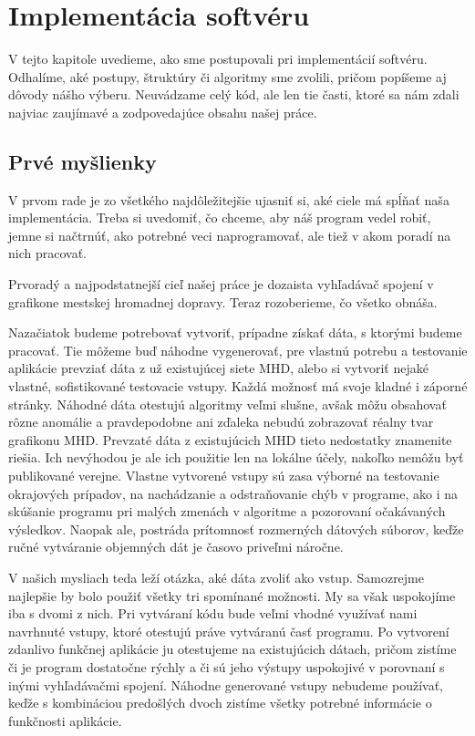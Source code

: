 \chapter[Implementácia]{Implementácia softvéru}
\label{kap:implementacia}

V tejto kapitole uvedieme, ako sme postupovali pri implementácií softvéru. Odhalíme, aké postupy, štruktúry či algoritmy sme zvolili, pričom popíšeme aj dôvody nášho výberu. Neuvádzame celý kód, ale len tie časti, ktoré sa nám zdali najviac zaujímavé a zodpovedajúce obsahu našej práce.\newline


\section{Prvé myšlienky}

V prvom rade je zo všetkého najdôležitejšie ujasniť si, aké ciele má spĺňať naša implementácia. Treba si uvedomiť, čo chceme, aby náš program vedel robiť, jemne si načtrnúť, ako potrebné veci naprogramovať, ale tiež v akom poradí na nich pracovať.\newline

Prvoradý a najpodstatnejší cieľ našej práce je dozaista vyhľadávač spojení v grafikone mestskej hromadnej dopravy. Teraz rozoberieme, čo všetko obnáša.\newline

Nazačiatok budeme potrebovať vytvoriť, prípadne získať dáta, s ktorými budeme pracovať. Tie môžeme buď náhodne vygenerovať, pre vlastnú potrebu a testovanie aplikácie prevziať dáta z už existujúcej siete MHD, alebo si vytvoriť nejaké vlastné, sofistikované testovacie vstupy. Každá možnosť má svoje kladné i záporné stránky. Náhodné dáta otestujú algoritmy veľmi slušne, avšak môžu obsahovať rôzne anomálie a pravdepodobne ani zďaleka nebudú zobrazovať réalny tvar grafikonu MHD. Prevzaté dáta z existujúcich MHD tieto nedostatky znamenite riešia. Ich nevýhodou je ale ich použitie len na lokálne účely, nakoľko nemôžu byť publikované verejne. Vlastne vytvorené vstupy sú zasa výborné na testovanie okrajových prípadov, na nachádzanie a odstraňovanie chýb v programe, ako i na skúšanie programu pri malých zmenách v algoritme a pozorovaní očakávaných výsledkov. Naopak ale, postráda prítomnosť rozmerných dátových súborov, keďže ručné vytváranie objemných dát je časovo priveľmi náročne.\newline

V našich mysliach teda leží otázka, aké dáta zvoliť ako vstup. Samozrejme najlepšie by bolo použiť všetky tri spomínané možnosti. My sa však uspokojíme iba s dvomi z nich. Pri vytváraní kódu bude veľmi vhodné využívať nami navrhnuté vstupy, ktoré otestujú práve vytváranú časť programu. Po vytvorení zdanlivo funkčnej aplikácie ju otestujeme na existujúcich dátach, pričom zistíme či je program dostatočne rýchly a či sú jeho výstupy uspokojivé v porovnaní s inými vyhľadávačmi spojení. Náhodne generované vstupy nebudeme používať, keďže s kombináciou predošlých dvoch zistíme všetky potrebné informácie o funkčnosti aplikácie.\newline

